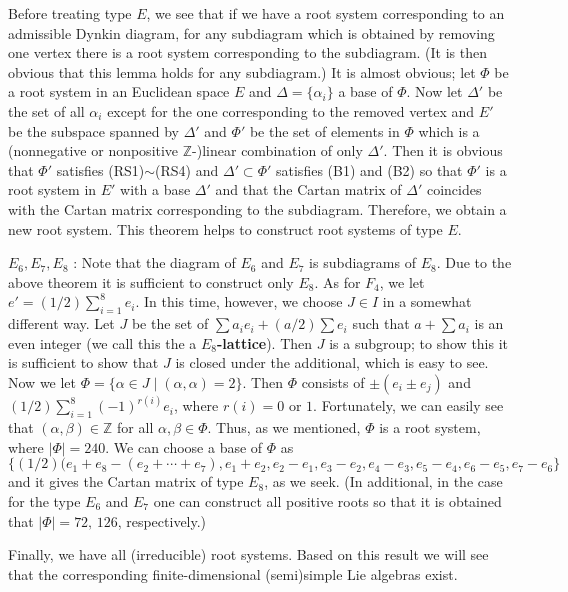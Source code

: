 \documentclass{article}
\newcommand{\InZ}{\mathbb{Z}}
\newcommand{\SBar}{\;|\;}
\begin{document}
Before treating type $E$, we see that if we have a root system corresponding to an admissible Dynkin diagram, for any subdiagram which is obtained by removing one vertex there is a root system corresponding to the subdiagram.
(It is then obvious that this lemma holds for any subdiagram.)
It is almost obvious; let $\Phi$ be a root system in an Euclidean space $E$ and $\Delta = \{\alpha_i\}$ a base of $\Phi$.
Now let $\Delta'$ be the set of all $\alpha_i$ except for the one corresponding to the removed vertex and $E'$ be the subspace spanned by $\Delta'$ and $\Phi'$ be the set of elements in $\Phi$ which is a (nonnegative or nonpositive $\InZ$-)linear combination of only $\Delta'$.
Then it is obvious that $\Phi'$ satisfies (RS1)$\sim$(RS4) and $\Delta' \subset \Phi'$ satisfies (B1) and (B2) so that $\Phi'$ is a root system in $E'$ with a base $\Delta'$ and that the Cartan matrix of $\Delta'$ coincides with the Cartan matrix corresponding to the subdiagram.
Therefore, we obtain a new root system.
This theorem helps to construct root systems of type $E$.

$E_6, E_7, E_8$ : Note that the diagram of $E_6$ and $E_7$ is subdiagrams of $E_8$.
Due to the above theorem it is sufficient to construct only $E_8$.
As for $F_4$, we let $e' = (1/2) \sum_{i = 1}^8 e_i$.
In this time, however, we choose $J \in I$ in a somewhat different way.
Let $J$ be the set of $\sum a_i e_i + (a/2) \sum e_i$ such that $a + \sum a_i$ is an even integer (we call this the a \textbf{$E_8$-lattice}).
Then $J$ is a subgroup; to show this it is sufficient to show that $J$ is closed under the additional, which is easy to see.
Now we let $\Phi = \{\alpha \in J \SBar (\alpha, \alpha) = 2\}$.
Then $\Phi$ consists of $\pm(e_i \pm e_j)$ and $(1/2) \sum_{i = 1}^8 (-1)^{r(i)} e_i$, where $r(i) = \textrm{0 or 1}$.
Fortunately, we can easily see that $(\alpha, \beta) \in \InZ$ for all $\alpha, \beta \in \Phi$.
Thus, as we mentioned, $\Phi$ is a root system, where $|\Phi| = 240$.
We can choose a base of $\Phi$ as $\{(1/2)(e_1 + e_8 - (e_2 + \cdots + e_7), e_1 + e_2, e_2 - e_1, e_3 - e_2, e_4 - e_3, e_5 - e_4, e_6 - e_5, e_7 - e_6\}$ and it gives the Cartan matrix of type $E_8$, as we seek.
(In additional, in the case for the type $E_6$ and $E_7$ one can construct all positive roots so that it is obtained that $|\Phi| = \textrm{72, 126}$, respectively.)

Finally, we have all (irreducible) root systems.
Based on this result we will see that the corresponding finite-dimensional (semi)simple Lie algebras exist.
\end{document}

